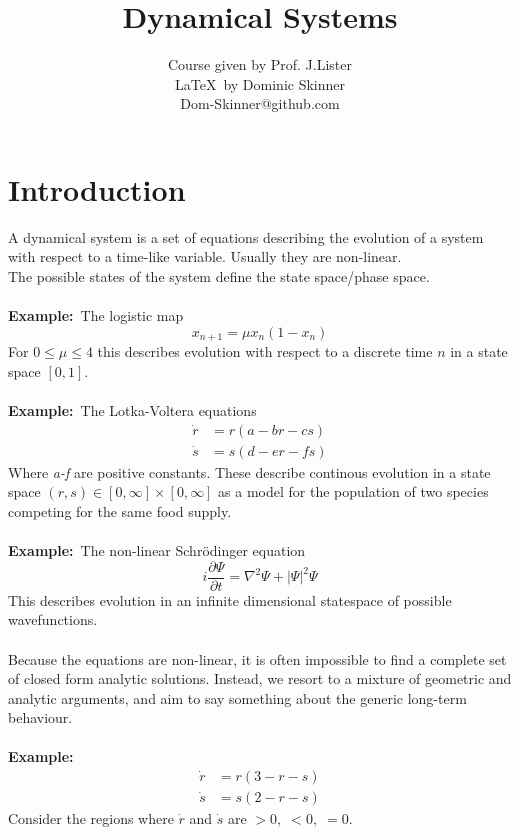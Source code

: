 \documentclass{article}
\newcommand{\example}{\textbf{Example:}}                    %
\begin{document}
\title{Dynamical Systems}
\author{Course given by Prof. J.Lister \\
\LaTeX\  by Dominic Skinner \\
Dom-Skinner@github.com}
\maketitle
\section*{Introduction}
A dynamical system is a set of equations describing the evolution of a system
with respect to a time-like variable. Usually they are non-linear.
\\
The possible states of the system define the state space/phase space.
\\
\\
\example\   The logistic map
\[ x_{n+1} = \mu x_n ( 1- x_n) \]
For $ 0 \leq \mu \leq 4 $ this describes evolution with respect to a discrete time 
$n$ in a state space $[0,1]$.
\\
\\
\example\   The Lotka-Voltera equations
\begin{align*}
\dot{r} &= r(a - br -cs) \\
\dot{s} &= s(d - er -fs)
\end{align*}
Where \emph{a-f} are positive constants. These describe continous evolution 
in a state space $(r,s) \in [0 , \infty] \times [0, \infty]$ as a model for 
the population of two species competing for the same food supply.
\\
\\
\example\   The non-linear Schr\"odinger equation
\[ i \frac{\partial \Psi}{ \partial t} = \nabla^2 \Psi + |\Psi|^2 \Psi \]
This describes evolution in an infinite dimensional statespace of possible
wavefunctions.
\\
\\
Because the equations are non-linear, it is often impossible to find a complete
set of closed form analytic solutions. Instead, we resort to a mixture of 
geometric and analytic arguments, and aim to say something about the generic
long-term behaviour.
\\
\\
\example\   
\begin{align*}
\dot{r} &= r(3 - r -s) \\
\dot{s} &= s(2 - r -s)
\end{align*}
Consider the regions where $\dot{r}$ and $\dot{s}$ are $>0, \; <0, \; =0$. 
\end{document}
